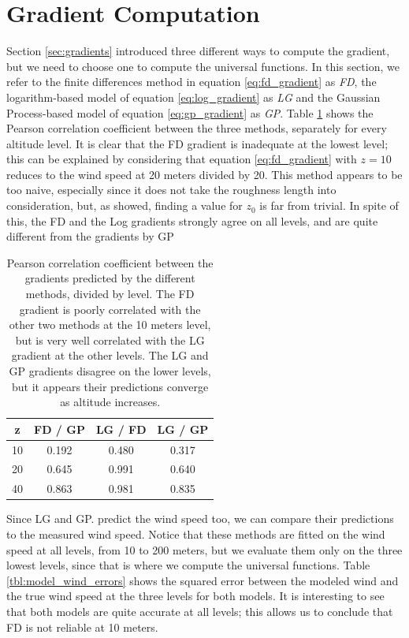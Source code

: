 \documentclass[a4paper]{book}
\begin{document}
\section{Gradient Computation}
\label{sec:res_gradient}
Section \ref{sec:gradients} introduced three different ways to compute the gradient, but we need to choose one to compute the universal functions. In this section, we refer to the finite differences method in equation \ref{eq:fd_gradient} as \emph{FD}, the logarithm-based model of equation \ref{eq:log_gradient} as \emph{LG} and the Gaussian Process-based model of equation \ref{eq:gp_gradient} as \emph{GP}. Table \ref{tbl:gradients_corr} shows the Pearson correlation coefficient between the three methods, separately for every altitude level. It is clear that the FD gradient is inadequate at the lowest level; this can be explained by considering that equation \ref{eq:fd_gradient} with $z=10$ reduces to the wind speed at 20 meters divided by 20. This method appears to be too naive, especially since it does not take the roughness length into consideration, but, as \cite{cabauw_z0} showed, finding a value for $z_0$ is far from trivial. In spite of this, the FD and the Log gradients strongly agree on all levels, and are quite different from the gradients by GP

\begin{table}[]
\centering
\caption{Pearson correlation coefficient between the gradients predicted by the different methods, divided by level. The FD gradient is poorly correlated with the other two methods at the 10 meters level, but is very well correlated with the LG gradient at the other levels. The LG and GP gradients disagree on the lower levels, but it appears their predictions converge as altitude increases.}
\label{tbl:gradients_corr}
\begin{tabular}{c|c|c|c}
\toprule
\textbf{z} & \textbf{FD / GP} & \textbf{LG / FD} & \textbf{LG / GP} \\ \midrule
 	10 & 	0.192 & 0.480 &	0.317 \\
 	20 &	0.645 	& 0.991 &	0.640 \\
 	40 &	0.863 & 0.981 &	0.835 \\
\bottomrule
\end{tabular}
\end{table}

Since LG and GP. predict the wind speed too, we can compare their predictions to the measured wind speed. Notice that these methods are fitted on the wind speed at all levels, from 10 to 200 meters, but we evaluate them only on the three lowest levels, since that is where we compute the universal functions. Table \ref{tbl:model_wind_errors} shows the squared error between the modeled wind and the true wind speed at the three levels for both models. It is interesting to see that both models are quite accurate at all levels; this allows us to conclude that FD is not reliable at 10 meters.
\end{document}
